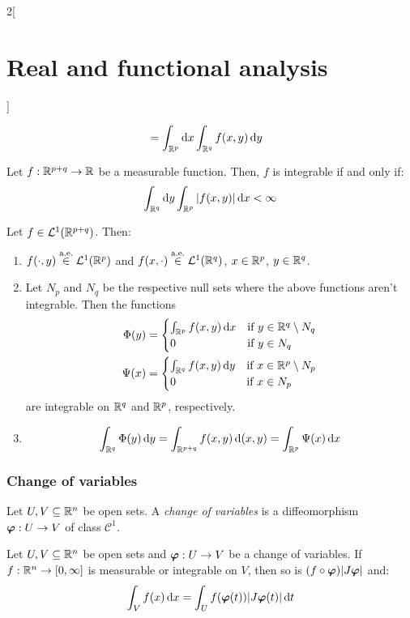 \documentclass[../../../main_math.tex]{subfiles}
\begin{document}
\begin{multicols}{2}[\section{Real and functional analysis}]
\begin{corollary}
\begin{align*}
                                         & =\int_{\mathbb{R}^p}\dd{x}\int_{\mathbb{R}^q}f(x,y)\dd{y}
    \end{align*}
  \end{corollary}
  \begin{corollary}
    Let $f:\mathbb{R}^{p+q}\rightarrow\mathbb{R}$ be a measurable function. Then, $f$ is integrable if and only if: $$\int_{\mathbb{R}^q}\dd{y}\int_{\mathbb{R}^p}\abs{f(x,y)}\dd{x}<\infty$$
  \end{corollary}
  \begin{theorem}\label{RFA_fubini}
    Let $f\in \mathcal{L}^1(\mathbb{R}^{p+q})$. Then:
    \begin{enumerate}
      \item $f(\cdot,y)\overset{\text{a.e.}}{\in} \mathcal{L}^1(\mathbb{R}^p)$ and $f(x,\cdot)\overset{\text{a.e.}}{\in}\mathcal{L}^1(\mathbb{R}^q)$, $x\in\mathbb{R}^p$, $y\in\mathbb{R}^q$.
      \item Let $N_p$ and $N_q$ be the respective null sets where the above functions aren't integrable. Then the functions
            \begin{align*}
              \Phi(y) & =\begin{cases}
                           \int_{\mathbb{R}^p}f(x,y)\dd{x} & \text{if } y\in\mathbb{R}^q\setminus N_q \\
                           0                        & \text{if } y\in N_q
                         \end{cases} \\ \Psi(x)&=\begin{cases}
                \int_{\mathbb{R}^q}f(x,y)\dd{y} & \text{if } x\in\mathbb{R}^p\setminus N_p \\
                0                        & \text{if } x\in N_p
              \end{cases}
            \end{align*}
            are integrable on $\mathbb{R}^q$ and $\mathbb{R}^p$, respectively.
      \item \hfill $$\int_{\mathbb{R}^q}\Phi(y)\dd{y}=\int_{\mathbb{R}^{p+q}}f(x,y)\dd{(x,y)}=\int_{\mathbb{R}^p}\Psi(x)\dd{x}$$
    \end{enumerate}
  \end{theorem}
  \subsubsection{Change of variables}
  \begin{definition}
    Let $U,V\subseteq\mathbb{R}^n$ be open sets. A \emph{change of variables} is a diffeomorphism $\boldsymbol{\mathrm{\varphi}}:U\rightarrow V$ of class $\mathcal{C}^1$.
  \end{definition}
  \begin{theorem}
    Let $U,V\subseteq\mathbb{R}^n$ be open sets and $\boldsymbol{\mathrm{\varphi}}:U\rightarrow V$ be a change of variables. If $f:\mathbb{R}^n\rightarrow[0,\infty]$ is measurable or integrable on $V$, then so is $(f\circ\boldsymbol{\mathrm{\varphi}})\abs{J\boldsymbol{\mathrm{\varphi}}}$ and: $$\int_{V} f(x)\dd{x}=\int_Uf(\boldsymbol{\mathrm{\varphi}}(t))\abs{J\boldsymbol{\mathrm{\varphi}}(t)}\dd{t}$$
  \end{theorem}

\end{multicols}
\end{document}
